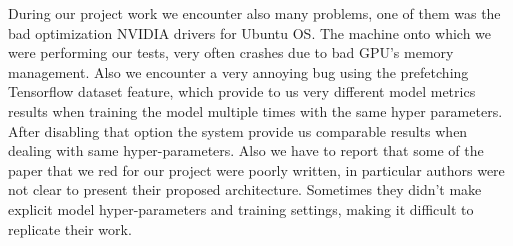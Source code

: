 During our project work we encounter also many problems, one of them was the bad optimization NVIDIA drivers for Ubuntu OS. The machine onto which we were performing our tests, very often crashes due to bad GPU's memory management. Also we encounter a very annoying bug using the prefetching Tensorflow dataset feature, which provide to us very different model metrics results when training the model multiple times with the same hyper parameters. After disabling that option the system provide us comparable results when dealing with same hyper-parameters. Also we have to report that some of the paper that we red for our project were poorly written, in particular authors were not clear to present their proposed architecture. Sometimes they didn't make explicit model hyper-parameters and training settings, making it difficult to replicate their work.
